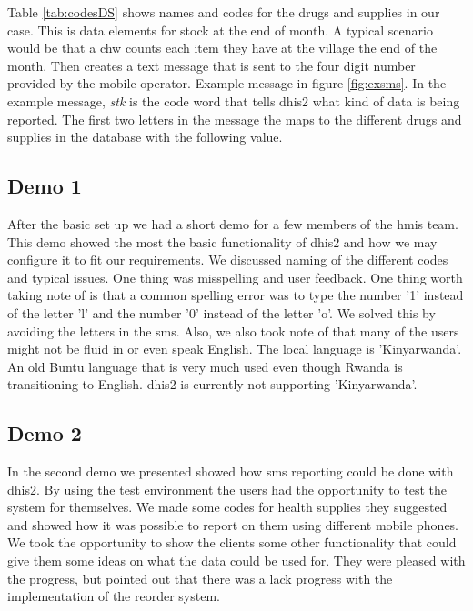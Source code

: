 Table \ref{tab:codesDS} shows names and codes for the drugs and supplies in our case. 
This is data elements for stock at the end of month.
A typical scenario would be that a \gls{chw} counts each item they have at the village the end of the month. Then creates a text message that is sent to the four digit number provided by the mobile operator. Example message in figure \ref{fig:exsms}. In the example message, \textit{stk} is the code word that tells \gls{dhis2} what kind of data is being reported. The first two letters in the message the maps to the different drugs and supplies in the database with the following value.  

\subsection{Demo 1}
After the basic set up we had a short demo for a few members of the \gls{hmis} team. 
This demo showed the most the basic functionality of \gls{dhis2} and how we may configure it to fit our requirements. We discussed naming of the different codes and typical issues. One thing was misspelling and user feedback. 
One thing worth taking note of is that a common spelling error was to type the number '1' instead of the letter 'l' and the number '0' instead of the letter 'o'. We solved this by avoiding the letters in the \gls{sms}. Also, we also took note of that many of the users might not be fluid in or even speak English. The local language is 'Kinyarwanda'. An old Buntu language that is very much used even though Rwanda is transitioning to English. \gls{dhis2} is currently not supporting 'Kinyarwanda'.

\subsection{Demo 2}
In the second demo we presented showed how \gls{sms} reporting could be done with \gls{dhis2}.
By using the test environment the users had the opportunity to test the system for themselves.
We made some codes for health supplies they suggested and showed how it was possible to report on them using different mobile phones.
We took the opportunity to show the clients some other functionality that could give them some ideas on what the data could be used for.
They were pleased with the progress, but pointed out that there was a lack progress with the implementation of the reorder system.




